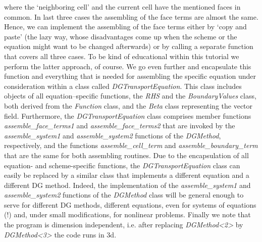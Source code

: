 \documentclass[11pt]{article}
\begin{document}
where the `neighboring cell' and the current cell have the mentioned
faces in common. In last three cases the assembling of the face terms
are almost the same. Hence, we can implement the assembling of the
face terms either by `copy and paste' (the lazy way, whose
disadvantages come up when the scheme or the equation might want to be
changed afterwards) or by calling a separate function that covers all
three cases. To be kind of educational within this tutorial we perform
the latter approach, of course. We go even further and encapsulate
this function and everything that is needed for assembling the
specific equation under consideration within a class called
\emph{DGTransportEquation}. This class includes objects of all
equation--specific functions, the \emph{RHS} and the
\emph{BoundaryValues} class, both derived from the \emph{Function}
class, and the \emph{Beta} class representing the vector field.
Furthermore, the \emph{DGTransportEquation} class comprises member
functions \emph{assemble\_face\_terms1} and
\emph{assemble\_face\_terms2} that are invoked by the
\emph{assemble\_system1} and \emph{assemble\_system2} functions of the
\emph{DGMethod}, respectively, and the functions
\emph{assemble\_cell\_term} and \emph{assemble\_boundary\_term} that
are the same for both assembling routines. Due to the encapsulation of
all equation- and scheme-specific functions, the
\emph{DGTransportEquation} class can easily be replaced by a similar
class that implements a different equation and a different DG method.
Indeed, the implementation of the \emph{assemble\_system1} and
\emph{assemble\_system2} functions of the \emph{DGMethod} class will
be general enough to serve for different DG methods, different
equations, even for systems of equations (!) and, under small
modifications, for nonlinear problems. Finally we note that the
program is dimension independent, i.e. after replacing
\emph{DGMethod<2>} by \emph{DGMethod<3>} the code runs in 3d.
\end{document}
